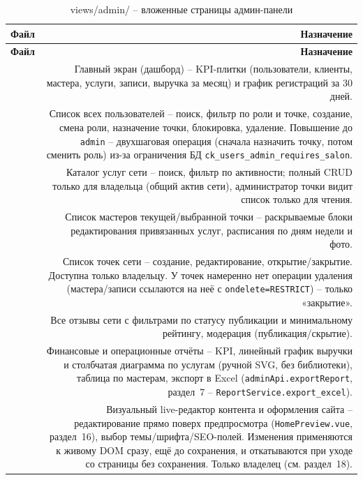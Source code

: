 \begin{xltabular}{\textwidth}{M D}
\caption{views/admin/ -- вложенные страницы админ-панели} \\
\hline
\textbf{Файл} & \textbf{Назначение} \\
\hline
\endfirsthead
\hline
\textbf{Файл} & \textbf{Назначение} \\
\hline
\endhead
\hline
\endfoot
{} & Главный экран (дашборд) -- KPI-плитки
  (пользователи, клиенты, мастера, услуги, записи, выручка за месяц) и
  график регистраций за 30 дней. \\
 & Список всех пользователей -- поиск, фильтр по
  роли и точке, создание, смена роли, назначение точки, блокировка,
  удаление. Повышение до \texttt{admin} -- двухшаговая операция
  (сначала назначить точку, потом сменить роль) из-за ограничения БД
  \texttt{ck_users_admin_requires_salon}. \\
 & Каталог услуг сети -- поиск, фильтр по
  активности; полный CRUD только для владельца (общий актив сети),
  администратор точки видит список только для чтения. \\
 & Список мастеров текущей/выбранной точки --
  раскрываемые блоки редактирования привязанных услуг, расписания по
  дням недели и фото. \\
 & Список точек сети -- создание, редактирование,
  открытие/закрытие. Доступна только владельцу. У точек намеренно нет
  операции удаления (мастера/записи ссылаются на неё с
  \texttt{ondelete=RESTRICT}) -- только «закрытие». \\
 & Все отзывы сети с фильтрами по статусу
  публикации и минимальному рейтингу, модерация (публикация/скрытие). \\
 & Финансовые и операционные отчёты -- KPI,
  линейный график выручки и столбчатая диаграмма по услугам (ручной
  SVG, без библиотеки), таблица по мастерам, экспорт в Excel
  (\texttt{adminApi.exportReport}, раздел~7 -- \texttt{ReportService.export_excel}). \\
 & Визуальный live-редактор контента и
  оформления сайта -- редактирование прямо поверх предпросмотра
  (\texttt{HomePreview.vue}, раздел~16), выбор темы/шрифта/SEO-полей.
  Изменения применяются к живому DOM сразу, ещё до сохранения, и
  откатываются при уходе со страницы без сохранения. Только владелец
  (см. раздел~18). \\
\end{xltabular}

